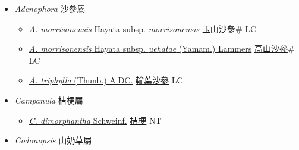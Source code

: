 
  \begin{itemize}
 \item[] \textit{Adenophora} 沙參屬
                    
  \begin{itemize}
        \item[] \href{http://www.theplantlist.org/tpl1.1/search?q=Adenophora+morrisonensis+subsp.+morrisonensis}{\textit{A. morrisonensis} Hayata subsp. \textit{morrisonensis}}   \href{\detokenize{http://taibnet.sinica.edu.tw/chi/taibnet_species_list.php?T2=玉山沙參&T2_new_value=true&fr=y}}{玉山沙參}\# LC
        \item[] \href{http://www.theplantlist.org/tpl1.1/search?q=Adenophora+morrisonensis+subsp.+uehatae}{\textit{A. morrisonensis} Hayata subsp. \textit{uehatae} (Yamam.) Lammers}   \href{\detokenize{http://taibnet.sinica.edu.tw/chi/taibnet_species_list.php?T2=高山沙參&T2_new_value=true&fr=y}}{高山沙參}\# LC
        \item[] \href{http://www.theplantlist.org/tpl1.1/search?q=Adenophora+triphylla}{\textit{A. triphylla} (Thunb.) A.DC.}   \href{\detokenize{http://taibnet.sinica.edu.tw/chi/taibnet_species_list.php?T2=輪葉沙參&T2_new_value=true&fr=y}}{輪葉沙參} LC
  \end{itemize}
 \item[] \textit{Campanula} 桔梗屬
                    
  \begin{itemize}
        \item[] \href{http://www.theplantlist.org/tpl1.1/search?q=Campanula+dimorphantha}{\textit{C. dimorphantha} Schweinf.}   \href{\detokenize{http://taibnet.sinica.edu.tw/chi/taibnet_species_list.php?T2=桔梗&T2_new_value=true&fr=y}}{桔梗} NT
  \end{itemize}
 \item[] \textit{Codonopsis} 山奶草屬
                    

\end{itemize}

